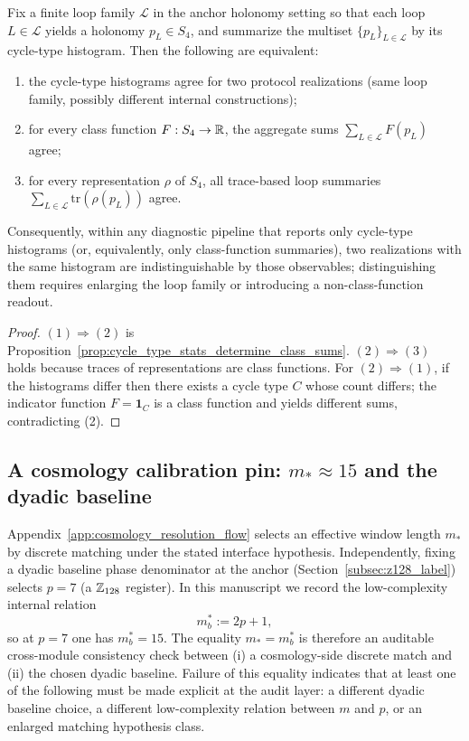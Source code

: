 \begin{proposition}\label{prop:cycle_type_identifiability_boundary}
\AuditTag Fix a finite loop family $\mathcal{L}$ in the anchor holonomy setting so that each loop $L\in\mathcal{L}$ yields a holonomy $p_L\in S_4$, and summarize the multiset $\{p_L\}_{L\in\mathcal{L}}$ by its cycle-type histogram.
Then the following are equivalent:
\begin{enumerate}
\item the cycle-type histograms agree for two protocol realizations (same loop family, possibly different internal constructions);
\item for every class function $F:S_4\to\mathbb{R}$, the aggregate sums $\sum_{L\in\mathcal{L}}F(p_L)$ agree;
\item for every representation $\rho$ of $S_4$, all trace-based loop summaries $\sum_{L\in\mathcal{L}}\mathrm{tr}(\rho(p_L))$ agree.
\end{enumerate}
Consequently, within any diagnostic pipeline that reports only cycle-type histograms (or, equivalently, only class-function summaries), two realizations with the same histogram are indistinguishable by those observables; distinguishing them requires enlarging the loop family or introducing a non-class-function readout.
\end{proposition}
\begin{proof}
$(1)\Rightarrow(2)$ is Proposition~\ref{prop:cycle_type_stats_determine_class_sums}.
$(2)\Rightarrow(3)$ holds because traces of representations are class functions.
For $(2)\Rightarrow(1)$, if the histograms differ then there exists a cycle type $C$ whose count differs; the indicator function $F=\mathbf{1}_{C}$ is a class function and yields different sums, contradicting (2).
\end{proof}

\subsection{A cosmology calibration pin: \texorpdfstring{$m_\ast\approx 15$}{m*=15} and the dyadic baseline}
\label{subsec:rigidity_cosmology_pin}

\begin{corollary}\label{cor:dyadic_cosmology_consistency_pin}
\AuditTag Appendix~\ref{app:cosmology_resolution_flow} selects an effective window length $m_\ast$ by discrete matching under the stated interface hypothesis.
Independently, fixing a dyadic baseline phase denominator at the anchor (Section~\ref{subsec:z128_label}) selects $p=7$ (a $\mathbb{Z}_{128}$ register).
In this manuscript we record the low-complexity internal relation
\[
m_b^\ast:=2p+1,
\]
so at $p=7$ one has $m_b^\ast=15$.
The equality $m_\ast=m_b^\ast$ is therefore an auditable cross-module consistency check between (i) a cosmology-side discrete match and (ii) the chosen dyadic baseline.
Failure of this equality indicates that at least one of the following must be made explicit at the audit layer: a different dyadic baseline choice, a different low-complexity relation between $m$ and $p$, or an enlarged matching hypothesis class.
\end{corollary}

